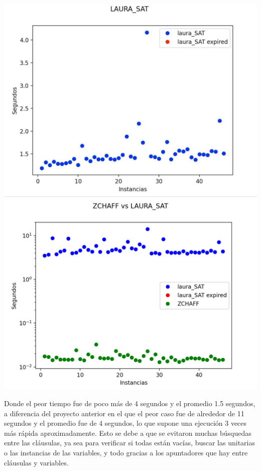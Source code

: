 \documentclass[letterpaper,12pt]{article}
\begin{document}
	\begin{center}
		\includegraphics[scale=0.17]{Grafica1.jpg}
		\includegraphics[scale=0.48]{Grafica2}
	\end{center}
	
Donde el peor tiempo fue de poco m\'as de 4 segundos y el promedio 1.5 segundos, a diferencia del proyecto anterior en el que el peor caso fue de alrededor de 11 segundos y el promedio fue de 4 segundos, lo que supone una ejecuci\'on 3 veces m\'as r\'apida aproximadamente. Esto se debe a que se evitaron muchas b\'usquedas entre las cl\'ausulas, ya sea para verificar si todas est\'an vac\'ias, buscar las unitarias o las instancias de las variables, y todo gracias a los apuntadores que hay entre cl\'ausulas y variables.
\end{document}
